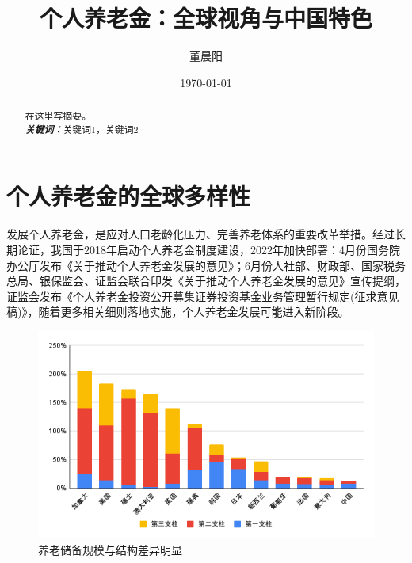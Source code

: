 \documentclass[a4paper,10.5pt]{ctexart}
\title{个人养老金：全球视角与中国特色}
\author{董晨阳}
\date{\today}
\providecommand{\keywords}[1]{\\\textbf{\textit{关键词：}}#1}
\begin{document}
\maketitle
\thispagestyle{empty}
\begin{abstract}
    在这里写摘要。
    \keywords{关键词1，关键词2}
\end{abstract}
\setcounter{secnumdepth}{0}
\tableofcontents
\clearpage
\setcounter{page}{1}
\section{个人养老金的全球多样性}
发展个人养老金，是应对人口老龄化压力、完善养老体系的重要改革举措。经过长期论证，我国于2018年启动个人养老金制度建设，2022年加快部署：4月份国务院办公厅发布《关于推动个人养老金发展的意见》；6月份人社部、财政部、国家税务总局、银保监会、证监会联合印发《关于推动个人养老金发展的意见》宣传提纲，证监会发布《个人养老金投资公开募集证券投资基金业务管理暂行规定(征求意见稿)》，随着更多相关细则落地实施，个人养老金发展可能进入新阶段。
\begin{figure}[H]
    \includegraphics[width=\linewidth]{img/三支柱规模占GDP比重.png}
    \caption{养老储备规模与结构差异明显}
\end{figure}
\end{document}
